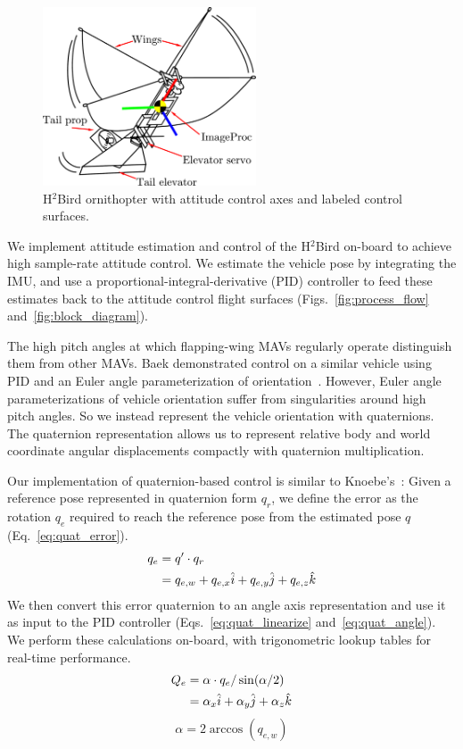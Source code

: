 \documentclass{aamas2013}
\begin{document}
\begin{figure}[!tb]
\centering
\includegraphics[height=150pt]{figures/h2bird_axes.pdf}
\caption{H$^2$Bird ornithopter with attitude control axes and labeled 
control surfaces.}
\label{fig:h2Bird_axes}
\end{figure}

We implement attitude estimation and control of the H$^2$Bird on-board to 
achieve high sample-rate attitude control. We estimate the vehicle pose by
integrating the IMU, and use a proportional-integral-derivative (PID) 
controller to feed these estimates back to the attitude control flight 
surfaces (Figs.~\ref{fig:process_flow} and~\ref{fig:block_diagram}).

The high pitch angles at which flapping-wing MAVs regularly operate 
distinguish them from other MAVs. Baek demonstrated control on a similar 
vehicle using PID and an Euler angle parameterization of orientation~\cite{baek:tracking}. 
However, Euler angle parameterizations of vehicle orientation suffer from 
singularities around high pitch angles. So we instead represent the vehicle 
orientation with quaternions. The quaternion representation allows us to 
represent relative body and world coordinate angular displacements compactly 
with quaternion multiplication.

Our implementation of quaternion-based control is similar to 
Knoebe's~\cite{knoebe:quatcontrol}:
Given a reference pose represented in quaternion form $q_r$, we define the 
error as the rotation $q_e$ required to reach the reference pose from the 
estimated pose $q$ (Eq.~\ref{eq:quat_error}). 
\begin{align}
\label{eq:quat_error}
q_e &= q^{\prime}\cdot q_r \\
		&= q_{e,w} + q_{e,x}\hat{i} + q_{e,y}\hat{j} + q_{e,z}\hat{k} \notag 
\end{align}
We then convert this error quaternion to an angle axis representation and 
use it as input to the PID controller (Eqs.~\ref{eq:quat_linearize} and~\ref{eq:quat_angle}).
We perform these calculations on-board, with trigonometric lookup tables for 
real-time performance.
\begin{align}
\label{eq:quat_linearize}
Q_e &= \alpha\cdot q_e/\sin(\alpha /2) \\
		&= \alpha_{x}\hat{i} + \alpha_{y}\hat{j} + \alpha_{z}\hat{k} \notag
\end{align}
\begin{equation}
\label{eq:quat_angle}
\alpha = 2\arccos(q_{e,w})
\end{equation}
\end{document}
